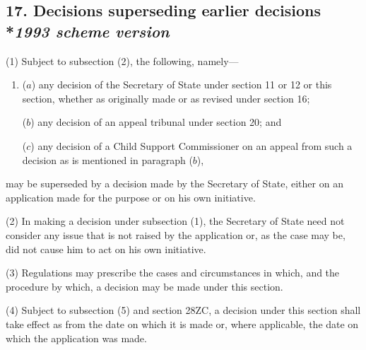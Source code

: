 \documentclass[12pt,a4paper]{article}
\begin{document}
%
%
%
%

\subsection[17. Decisions superseding earlier decisions --- \emph{1993 scheme version}]{17. Decisions superseding earlier decisions\\*\emph{1993 scheme version}}

(1) Subject to subsection (2), the following, namely—
\begin{enumerate}\item[]
($a$) any decision of the Secretary of State under section 11 or 12 or this section, whether as originally made or as revised under section 16;

($b$) any decision of an appeal tribunal under section 20; and

($c$) any decision of a Child Support Commissioner on an appeal from such a decision as is mentioned in paragraph ($b$),
\end{enumerate}
may be superseded by a decision made by the Secretary of State, either on an application made for the purpose or on his own initiative.

(2) In making a decision under subsection (1), the Secretary of State need not consider any issue that is not raised by the application or, as the case may be, did not cause him to act on his own initiative.

(3) Regulations may prescribe the cases and circumstances in which, and the procedure by which, a decision may be made under this section.

(4) Subject to subsection (5) and section 28ZC, a decision under this section shall take effect as from the date on which it is made or, where applicable, the date on which the application was made.
\end{document}

